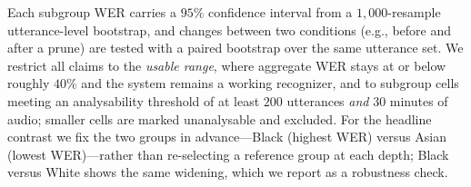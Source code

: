 Each subgroup WER carries a $95\%$ confidence interval from a $1{,}000$-resample
utterance-level bootstrap, and changes between two conditions (e.g., before and
after a prune) are tested with a paired bootstrap over the same utterance set.
We restrict all claims to the \emph{usable range}, where aggregate WER stays at
or below roughly $40\%$ and the system remains a working recognizer, and to
subgroup cells meeting an analysability threshold of at least $200$ utterances
\emph{and} $30$ minutes of audio; smaller cells are marked unanalysable and
excluded. For the headline contrast we fix the two groups in advance---Black
(highest WER) versus Asian (lowest WER)---rather than re-selecting a reference
group at each depth; Black versus White shows the same widening, which we report
as a robustness check.
